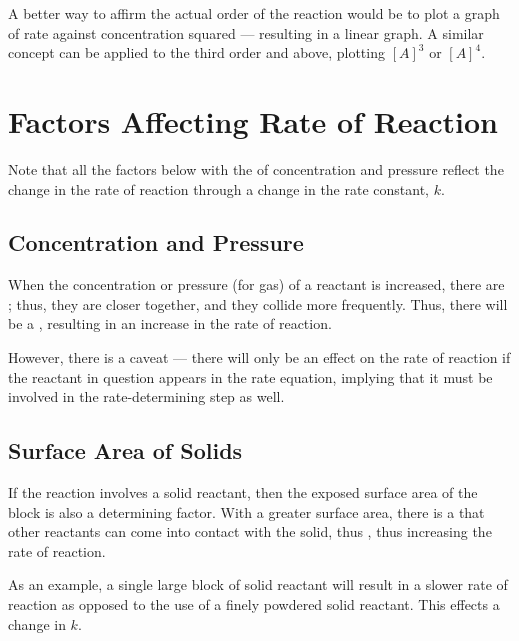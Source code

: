 				A better way to affirm the actual order of the reaction would be to plot a graph of rate against concentration
				squared --- resulting in a linear graph. A similar concept can be applied to the third order and above, plotting
				$[A]^{3}$ or $[A]^{4}$.








	\section{Factors Affecting Rate of Reaction}

		Note that all the factors below with the  of concentration and pressure reflect the change in the rate of reaction
		through a change in the rate constant, $k$.

		\subsection{Concentration and Pressure}

			When the concentration or pressure (for gas) of a reactant is increased, there are ; thus, they are closer together, and they collide more frequently. Thus, there will be a
			, resulting in an increase in the rate of reaction.

			However, there is a caveat --- there will only be an effect on the rate of reaction if the reactant in question appears
			in the rate equation, implying that it must be involved in the rate-determining step as well.


		\subsection{Surface Area of Solids}

			If the reaction involves a solid reactant, then the exposed surface area of the block is also a determining factor. With a
			greater surface area, there is a  that other reactants can come into contact with the solid, thus
			, thus increasing the rate of reaction.

			As an example, a single large block of solid reactant will result in a slower rate of reaction as opposed to the use of a
			finely powdered solid reactant. This effects a change in $k$.

